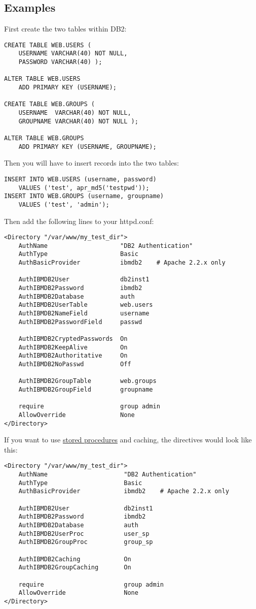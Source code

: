 \documentclass[11pt,a4paper]{article}
\begin{document}
\subsection{Examples}
First create the two tables within DB2:
\begin{verbatim}
CREATE TABLE WEB.USERS (
    USERNAME VARCHAR(40) NOT NULL,
    PASSWORD VARCHAR(40) );

ALTER TABLE WEB.USERS
    ADD PRIMARY KEY (USERNAME);

CREATE TABLE WEB.GROUPS (
    USERNAME  VARCHAR(40) NOT NULL,
    GROUPNAME VARCHAR(40) NOT NULL );

ALTER TABLE WEB.GROUPS
    ADD PRIMARY KEY (USERNAME, GROUPNAME);
\end{verbatim}
Then you will have to insert records into the two tables:
\begin{verbatim}
INSERT INTO WEB.USERS (username, password)
    VALUES ('test', apr_md5('testpwd'));
INSERT INTO WEB.GROUPS (username, groupname) 
    VALUES ('test', 'admin');
\end{verbatim}
Then add the following lines to your httpd.conf:
\newpage
\begin{verbatim}
<Directory "/var/www/my_test_dir">
    AuthName                    "DB2 Authentication"
    AuthType                    Basic
    AuthBasicProvider           ibmdb2    # Apache 2.2.x only

    AuthIBMDB2User              db2inst1
    AuthIBMDB2Password          ibmdb2
    AuthIBMDB2Database          auth
    AuthIBMDB2UserTable         web.users
    AuthIBMDB2NameField         username
    AuthIBMDB2PasswordField     passwd

    AuthIBMDB2CryptedPasswords  On
    AuthIBMDB2KeepAlive         On
    AuthIBMDB2Authoritative     On
    AuthIBMDB2NoPasswd          Off

    AuthIBMDB2GroupTable        web.groups
    AuthIBMDB2GroupField        groupname

    require                     group admin
    AllowOverride               None
</Directory>
\end{verbatim}
If you want to use \hyperlink{hsps}{stored procedures} and caching, the directives would look like this:
\begin{verbatim}
<Directory "/var/www/my_test_dir">
    AuthName                     "DB2 Authentication"
    AuthType                     Basic
    AuthBasicProvider            ibmdb2    # Apache 2.2.x only

    AuthIBMDB2User               db2inst1
    AuthIBMDB2Password           ibmdb2
    AuthIBMDB2Database           auth
    AuthIBMDB2UserProc           user_sp
    AuthIBMDB2GroupProc          group_sp

    AuthIBMDB2Caching            On
    AuthIBMDB2GroupCaching       On

    require                      group admin
    AllowOverride                None
</Directory>
\end{verbatim}
\newpage
\end{document}

